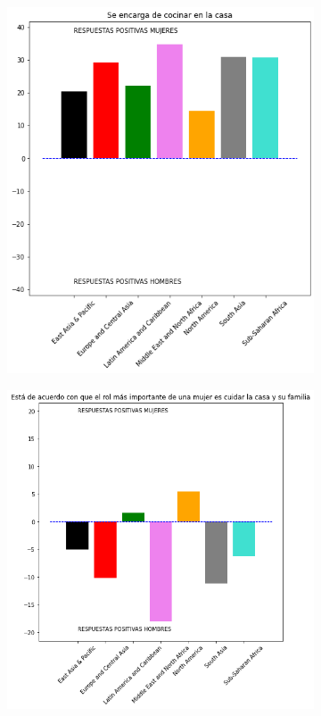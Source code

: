 \documentclass[12pt]{article}
\begin{document}
\begin{figure}
\begin{subfigure}[b]{0.45\textwidth}
         \caption{}
         \label{fig:222}
     \end{subfigure}
     \hfill
     \begin{subfigure}[b]{0.45\textwidth}
         \centering
         \includegraphics[width=\textwidth]{images/223.png}
         \caption{}
         \label{fig:223}
     \end{subfigure}
     \hfill
     \begin{subfigure}[b]{0.45\textwidth}
         \centering
         \includegraphics[width=\textwidth]{images/224.png}

\end{subfigure}
\end{figure}
\end{document}
